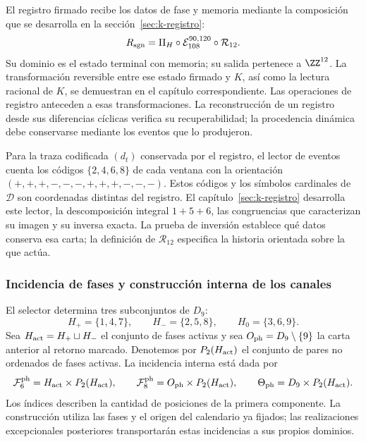 El registro firmado recibe los datos de fase y memoria mediante la
composición que se desarrolla en la sección~\ref{sec:k-registro}:
\begin{equation}
 R_{\rm sgn}=\Pi_H\circ\mathcal E_{108}^{90,120}
                         \circ\mathcal R_{12}.
 \label{tpk-int:registro-causal}
\end{equation}
Su dominio es el estado terminal con memoria; su salida pertenece a
\(\ZZ^{12}\). La transformación reversible entre ese estado firmado
y \(K\), así como la lectura racional de \(K\), se demuestran en
el capítulo correspondiente. Las operaciones de registro anteceden a
esas transformaciones. La reconstrucción de un registro desde sus
diferencias cíclicas verifica su recuperabilidad; la procedencia dinámica
debe conservarse mediante los eventos que lo produjeron.

Para la traza codificada \((d_t)\) conservada por el registro, el
lector de eventos cuenta los códigos \(\{2,4,6,8\}\) de cada
ventana con la orientación
\((+,+,+,-,-,-,+,+,+,-,-,-)\). Estos códigos y los símbolos
cardinales de \(\mathcal D\) son coordenadas distintas del
registro. El capítulo~\ref{sec:k-registro} desarrolla este lector,
la descomposición integral \(1+5+6\), las congruencias que
caracterizan su imagen y su inversa exacta. La prueba de inversión
establece qué datos conserva esa carta; la definición de
\(\mathcal R_{12}\) especifica la historia orientada sobre la que
actúa.

\subsubsection{Incidencia de fases y construcción interna de los canales}
\label{tpk-int:incidencia}

El selector determina tres subconjuntos de \(D_9\):
\[
 H_+=\{1,4,7\},\qquad H_-=\{2,5,8\},\qquad H_0=\{3,6,9\}.
\]
Sea \(H_{\rm act}=H_+\sqcup H_-\) el conjunto de fases activas y
sea \(O_{\rm ph}=D_9\setminus\{9\}\) la carta anterior al retorno
marcado. Denotemos por \(P_2(H_{\rm act})\) el conjunto de pares
no ordenados de fases activas. La incidencia interna está dada por
\begin{equation}
 \mathcal F^{\rm ph}_6=H_{\rm act}\times P_2(H_{\rm act}),\qquad
 \mathcal F^{\rm ph}_8=O_{\rm ph}\times P_2(H_{\rm act}),\qquad
 \Theta_{\rm ph}=D_9\times P_2(H_{\rm act}).
 \label{tpk-int:fases90120}
\end{equation}
Los índices describen la cantidad de posiciones de la primera componente.
La construcción utiliza las fases y el origen del calendario ya fijados;
las realizaciones excepcionales posteriores transportarán estas
incidencias a sus propios dominios.

